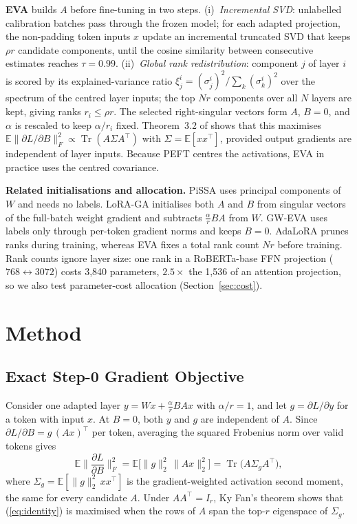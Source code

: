\documentclass[letterpaper]{article} %
\newcommand{\E}{\mathbb{E}}
\newcommand{\Sg}{\Sigma_g}
\newcommand{\norm}[1]{\lVert #1\rVert}
\newcommand{\Tr}{\operatorname{Tr}}
\begin{document}
\label{sec:eva}
\textbf{EVA} \citep{paischer2025eva} builds $A$ before fine-tuning in two steps. (i)~\emph{Incremental SVD}: unlabelled calibration batches pass through the frozen model; for each adapted projection, the non-padding token inputs $x$ update an incremental truncated SVD \citep{ross2008incremental} that keeps $\rho r$ candidate components, until the cosine similarity between consecutive estimates reaches $\tau=0.99$. (ii)~\emph{Global rank redistribution}: component $j$ of layer $i$ is scored by its explained-variance ratio $\xi^i_j=(\sigma^i_j)^2/\sum_k(\sigma^i_k)^2$ over the spectrum of the centred layer inputs; the top $Nr$ components over all $N$ layers are kept, giving ranks $r_i\le\rho r$. The selected right-singular vectors form $A$, $B=0$, and $\alpha$ is rescaled to keep $\alpha/r_i$ fixed. Theorem~3.2 of \citet{paischer2025eva} shows that this maximises $\E\norm{\partial L/\partial B}_F^2\propto\Tr(A\Sigma A^\top)$ with $\Sigma=\E[xx^\top]$, provided output gradients are independent of layer inputs. Because PEFT centres the activations, EVA in practice uses the centred covariance.

\textbf{Related initialisations and allocation.} PiSSA uses principal components of $W$ and needs no labels. LoRA-GA initialises both $A$ and $B$ from singular vectors of the full-batch weight gradient and subtracts $\frac{\alpha}{r}BA$ from $W$. GW-EVA uses labels only through per-token gradient norms and keeps $B=0$. AdaLoRA \citep{zhang2023adalora} prunes ranks during training, whereas EVA fixes a total rank count $Nr$ before training. Rank counts ignore layer size: one rank in a RoBERTa-base FFN projection ($768\leftrightarrow3072$) costs 3,840 parameters, $2.5\times$ the 1,536 of an attention projection, so we also test parameter-cost allocation (Section~\ref{sec:cost}).

\section{Method}
\label{sec:method}

\subsection{Exact Step-0 Gradient Objective}
\label{sec:identity}
Consider one adapted layer $y=Wx+\frac{\alpha}{r}BAx$ with $\alpha/r=1$, and let $g=\partial L/\partial y$ for a token with input $x$. At $B=0$, both $y$ and $g$ are independent of $A$. Since $\partial L/\partial B=g\,(Ax)^\top$ per token, averaging the squared Frobenius norm over valid tokens gives
\begin{equation}
\E\Big\lVert\frac{\partial L}{\partial B}\Big\rVert_F^2
=\E\big[\norm{g}_2^2\,\norm{Ax}_2^2\big]
=\Tr\big(A\Sg A^\top\big),
\label{eq:identity}
\end{equation}
where $\Sg=\E[\norm{g}_2^2\,xx^\top]$ is the gradient-weighted activation second moment, the same for every candidate $A$. Under $AA^\top=I_r$, Ky Fan's theorem \citep{fan1949theorem} shows that (\ref{eq:identity}) is maximised when the rows of $A$ span the top-$r$ eigenspace of $\Sg$.
\end{document}
